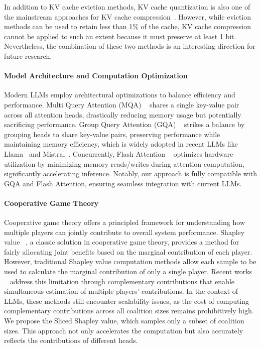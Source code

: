 In addition to KV cache eviction methods, KV cache quantization is also one of the mainstream approaches for KV cache compression~\cite{yang2024no,liukivi}. However, while eviction methods can be used to retain less than 1\% of the cache, KV cache compression cannot be applied to such an extent because it must preserve at least 1 bit. Nevertheless, the combination of these two methods is an interesting direction for future research.

\paragraph{Model Architecture and Computation Optimization}
Modern LLMs employ architectural optimizations to balance efficiency and performance. Multi Query Attention (MQA) ~\cite{mqa} shares a single key-value pair across all attention heads, drastically reducing memory usage but potentially sacrificing performance. Group Query Attention (GQA) ~\cite{gqa} strikes a balance by grouping heads to share key-value pairs, preserving performance while maintaining memory efficiency, which is widely adopted in recent LLMs like Llama~\cite{llama3} and Mistral~\cite{mistral}. Concurrently, Flash Attention ~\cite{flashattention} optimizes hardware utilization by minimizing memory reads/writes during attention computation, significantly accelerating inference. Notably, our approach is fully compatible with GQA and Flash Attention, ensuring seamless integration with current LLMs.

\paragraph{Cooperative Game Theory } Cooperative game theory offers a principled framework for understanding how multiple players can jointly contribute to overall system performance. Shapley value ~\cite{shapley}, a classic solution in cooperative game theory, provides a method for fairly allocating joint benefits based on the marginal contribution of each player. However, traditional Shapley value computation methods allow each sample to be used to calculate the marginal contribution of only a single player.
Recent works ~\cite{cc,sun2024shapley} address this limitation through complementary contributions that enable simultaneous estimation of multiple players' contributions. In the context of LLMs, these methods still encounter scalability issues, as the cost of computing complementary contributions across all coalition sizes remains prohibitively high.
We propose the Sliced Shapley value, which samples only a subset of coalition sizes. This approach not only accelerates the computation but also accurately reflects the contributions of different heads.